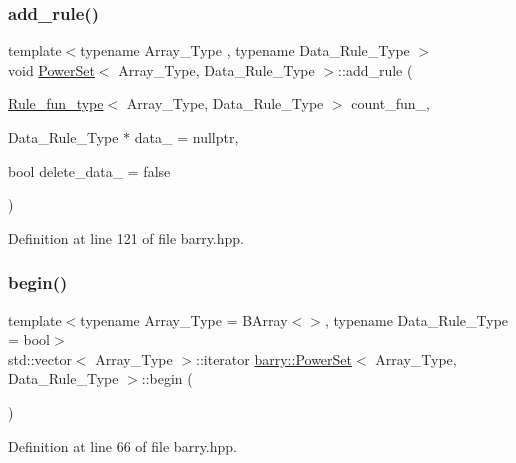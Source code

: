 \subsubsection{\texorpdfstring{add\+\_\+rule()}{add\_rule()}\hspace{0.1cm}{\footnotesize\ttfamily [3/3]}}
{\footnotesize\ttfamily template$<$typename Array\+\_\+\+Type , typename Data\+\_\+\+Rule\+\_\+\+Type $>$ \\
void \hyperlink{classbarry_1_1_power_set}{Power\+Set}$<$ Array\+\_\+\+Type, Data\+\_\+\+Rule\+\_\+\+Type $>$\+::add\+\_\+rule (\begin{DoxyParamCaption}\item[{\hyperlink{namespacebarry_aefd7e6d4ba228e2ce1074d075c512178}{Rule\+\_\+fun\+\_\+type}$<$ Array\+\_\+\+Type, Data\+\_\+\+Rule\+\_\+\+Type $>$}]{count\+\_\+fun\+\_\+,  }\item[{Data\+\_\+\+Rule\+\_\+\+Type $\ast$}]{data\+\_\+ = {\ttfamily nullptr},  }\item[{bool}]{delete\+\_\+data\+\_\+ = {\ttfamily false} }\end{DoxyParamCaption})\hspace{0.3cm}{\ttfamily [inline]}}



Definition at line 121 of file barry.\+hpp.

\mbox{\label{classbarry_1_1_power_set_a0db34800ac228a47917cc9f3e08a88a9}} 
\subsubsection{\texorpdfstring{begin()}{begin()}}
{\footnotesize\ttfamily template$<$typename Array\+\_\+\+Type  = B\+Array$<$$>$, typename Data\+\_\+\+Rule\+\_\+\+Type  = bool$>$ \\
std\+::vector$<$ Array\+\_\+\+Type $>$\+::iterator \hyperlink{classbarry_1_1_power_set}{barry\+::\+Power\+Set}$<$ Array\+\_\+\+Type, Data\+\_\+\+Rule\+\_\+\+Type $>$\+::begin (\begin{DoxyParamCaption}{ }\end{DoxyParamCaption})\hspace{0.3cm}{\ttfamily [inline]}}



Definition at line 66 of file barry.\+hpp.

